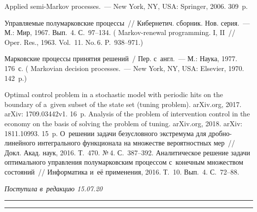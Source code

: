 \begin{multicols}{2}
{{\begin{thebibliography}{99}
Applied semi-Markov processes.~--- New York, NY, USA: Springer, 2006. 309~p.

Управляемые полумарковские процессы~// 
Кибернетич. сборник. Нов. серия.~--- М.: Мир, 1967. 
 Вып.~4. С.~97--134.
 ( Markov-renewal programming. 
I, II~//  {Oper. Res.}, 1963. Vol.~11. No.\,6. P.~938--971.)

Марковские процессы принятия решений~/
Пер. с~англ.~--- М.: Наука, 1977. 176~с.
(
 {Markovian decision processes}.~--- New York, NY, USA: Elsevier,
 1970. 142~p.)

 Optimal control problem in a stochastic 
model with periodic hits on the boundary of a~given subset of the state set 
(tuning problem). arXiv.org, 2017. arXiv: 1709.03442v1. 16~p.
 Analysis of the problem 
of intervention control in the economy on the basis of solving the problem of 
tuning. arXiv.org, 2018. arXiv: 1811.10993. 15~p.    
О~решении задачи безусловного экстремума 
для дроб\-но-ли\-ней\-но\-го интегрального функционала на 
множестве вероятностных мер~//
Докл. Акад. наук, 2016. Т.~470. №\,4. С.~387--392.
  
Аналитическое решение задачи оптимального управ\-ле\-ния полумарковским процессом 
с~конечным множеством со\-сто\-яний~// Информатика и~её применения, 2016. Т.~10. 
Вып.~4. С.~72--88.
\end{thebibliography}

 }
 }

\end{multicols}

\vspace*{-9pt}

\hfill{\small\textit{Поступила в~редакцию 15.07.20}}

\vspace*{8pt}




\hrule

\vspace*{2pt}

\hrule

\vspace*{-2pt}

